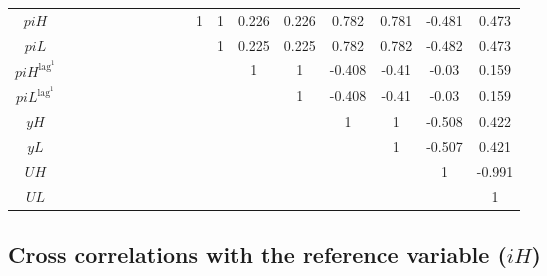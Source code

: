 \begin{tabular}{c|ccccccccccccccccc|}
${p\!i\!H}$ &  &  &  &  &  &  &  &  &  & 1 & 1 & 0.226 & 0.226 & 0.782 & 0.781 & -0.481 & 0.473 \\
${p\!i\!L}$ &  &  &  &  &  &  &  &  &  &  & 1 & 0.225 & 0.225 & 0.782 & 0.782 & -0.482 & 0.473 \\
${p\!i\!H}^{\mathrm{lag}^{\mathrm{1}}}$ &  &  &  &  &  &  &  &  &  &  &  & 1 & 1 & -0.408 & -0.41 & -0.03 & 0.159 \\
${p\!i\!L}^{\mathrm{lag}^{\mathrm{1}}}$ &  &  &  &  &  &  &  &  &  &  &  &  & 1 & -0.408 & -0.41 & -0.03 & 0.159 \\
${y\!H}$ &  &  &  &  &  &  &  &  &  &  &  &  &  & 1 & 1 & -0.508 & 0.422 \\
${y\!L}$ &  &  &  &  &  &  &  &  &  &  &  &  &  &  & 1 & -0.507 & 0.421 \\
${U\!H}$ &  &  &  &  &  &  &  &  &  &  &  &  &  &  &  & 1 & -0.991 \\
${U\!L}$ &  &  &  &  &  &  &  &  &  &  &  &  &  &  &  &  & 1 \\
\hline
\end{tabular}


\subsection{Cross correlations with the reference variable (${i\!H}$)}

